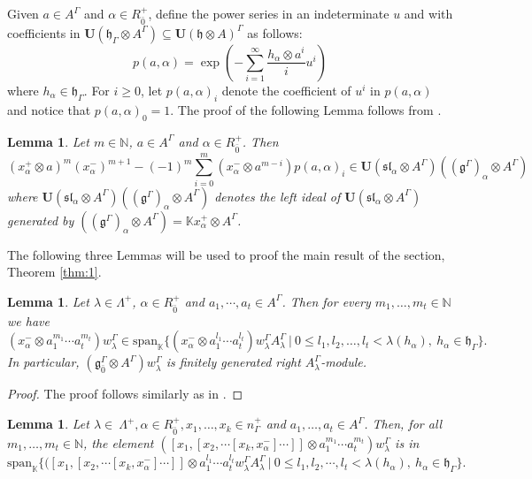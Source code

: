 \documentclass[11pt]{amsart}
\theoremstyle{plain}
\newtheorem{lemma}[thm]{Lemma}
\theoremstyle{definition}
\newcommand{\N}{\mathbb{N}}
\newcommand{\g}{\mathfrak{g}}
\newcommand{\h}{\mathfrak{h}}
\begin{document}
Given $a\in A^\Gamma$ and $\alpha\in R^{+}_{\bar{0}}$, define the power series in an indeterminate $u$ and with coefficients in $\mathbf{U}(\h_{\Gamma}\otimes A^{\Gamma})\subseteq\mathbf{U}(\h\otimes A)^{\Gamma}$ as follows:
\begin{equation}
    p(a,\alpha) = \exp \left( -\sum_{i=1}^{\infty} \frac{h_{\alpha} \otimes a^{i}}{i} u^{i} \right)
\end{equation}
where $h_{\alpha}\in\h_{\Gamma}$. For $i\geq 0$, let $p(a,\alpha)_i$ denote the coefficient of $u^i$ in $p(a,\alpha)$ and notice that $p(a,\alpha)_0=1$. The proof of the following Lemma follows from \cite[Lemma 7.5]{Garland1978}.
\begin{lemma}
Let $m\in\N$, $a\in A^{\Gamma}$ and $\alpha\in R_{\bar{0}}^+$. Then
\begin{equation*}
        (x^{+}_{\alpha}\otimes a)^{m}(x_{\alpha}^-)^{m+1}-(-1)^m\sum_{i=0}^{m}(x_{\alpha}^-\otimes a^{m-i})p(a,\alpha)_{i}\in\mathbf{U}(\mathfrak{sl}_{\alpha}\otimes A^{\Gamma})((\g^{\Gamma})_{\alpha} \otimes A^{\Gamma})
        \end{equation*}
where $\mathbf{U}(\mathfrak{sl}_{\alpha}\otimes A^{\Gamma})((\g^{\Gamma})_{\alpha}\otimes A^{\Gamma})$ denotes the left ideal of $\mathbf{U}(\mathfrak{sl}_{\alpha}\otimes A^{\Gamma})$ generated by $((\g^{\Gamma})_{\alpha}\otimes A^{\Gamma})=\mathbb{K} x^{+}_{\alpha}\otimes A^{\Gamma}$.
\end{lemma}
The following three Lemmas will be used to proof the main result of the section, Theorem \ref{thm:1}.
\begin{lemma}\label{lem:6}
Let $\lambda\in \Lambda^+$, $\alpha\in R_{\bar{0}}^+$ and $a_{1},\cdots,a_{t}\in A^{\Gamma}$. Then for every $m_{1},\ldots, m_{t}\in \N$ we have
\[(x_{\alpha}^-\otimes a_{1}^{m_1}\cdots a_{t}^{m_t})w_{\lambda}^{\Gamma}\in \mathrm{span}_{\mathbb{K}}\{(x_{\alpha}^-\otimes a^{l_1}_{1}\cdots a^{l_t}_{t})w_{\lambda}^{\Gamma}A_{\lambda}^{\Gamma}~|~0\leq l_{1}, l_{2},\ldots,l_{t}<\lambda(h_{\alpha}),~h_{\alpha}\in\h_{\Gamma}\}.\]
In particular, $(\g_{\bar{0}}^{\Gamma}\otimes A^{\Gamma})w_{\lambda}^{\Gamma}$ is finitely generated right $A_{\lambda}^{\Gamma}$-module.
\end{lemma}
\begin{proof}
The proof follows similarly as in \cite[Lemma 7.3]{BCM19}.
\end{proof}
\begin{lemma}{\label{lem:7}}
Let $\lambda\in\ \Lambda^{+}, \alpha\in R^{+}_{\bar{0}}, x_{1},\ldots, x_{k}\in n^{+}_{\Gamma}$ and $a_{1},\ldots, a_{t}\in A^{\Gamma}$. Then, for all $m_{1},\ldots, m_{t}\in \mathbb{N}$, the element $([x_{1},[x_{2},\cdots[x_{k},x_{\alpha}^{-}]\cdots]]\otimes a_{1}^{m_{1}}\cdots a_{t}^{m_{t}})w_{\lambda}^{\Gamma}$ is in
\begin{equation*}
        \mathrm{span}_{\mathbb{K}}\{([x_{1},[x_2,\cdots[x_{k},x_{\alpha}^{-}]\cdots]]\otimes a_{1}^{l_{1}}\cdots a_{t}^{l_{t}}w_{\lambda}^{\Gamma}A_{\lambda}^{\Gamma}~|~0\leq l_{1},l_{2},\cdots,l_{t}<\lambda(h_\alpha),~h_{\alpha}\in\h_{\Gamma}\}.
    \end{equation*}
\end{lemma}
\end{document}

